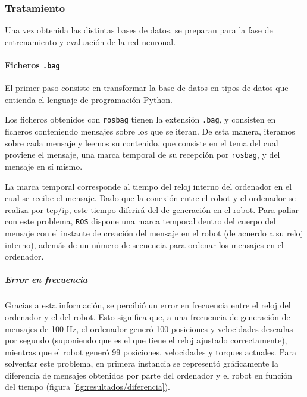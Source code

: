 \subsubsection{Tratamiento}
Una vez obtenida las distintas bases de datos, se preparan para la fase de entrenamiento y evaluación de la red neuronal.

\paragraph{Ficheros \texttt{.bag}}
El primer paso consiste en transformar la base de datos en tipos de datos que entienda el lenguaje de programación Python.

Los ficheros obtenidos con \texttt{rosbag} tienen la extensión \texttt{.bag}, y consisten en ficheros conteniendo mensajes sobre los que se iteran. De esta manera, iteramos sobre cada mensaje y leemos su contenido, que consiste en el tema del cual proviene el mensaje, una marca temporal de su recepción por \texttt{rosbag}, y del mensaje en sí mismo.

La marca temporal corresponde al tiempo del reloj interno del ordenador en el cual se recibe el mensaje. Dado que la conexión entre el robot y el ordenador se realiza por tcp/ip, este tiempo diferirá del de generación en el robot. Para paliar con este problema, \texttt{ROS} dispone una marca temporal dentro del cuerpo del mensaje con el instante de creación del mensaje en el robot (de acuerdo a su reloj interno), además de un número de secuencia para ordenar los mensajes en el ordenador.

\subparagraph{Error en frecuencia}
Gracias a esta información, se percibió un error en frecuencia entre el reloj del ordenador y el del robot. Esto significa que, a una frecuencia de generación de mensajes de 100 Hz, el ordenador generó 100 posiciones y velocidades deseadas por segundo (suponiendo que es el que tiene el reloj ajustado correctamente), mientras que el robot generó 99 posiciones, velocidades y torques actuales. Para solventar este problema, en primera instancia se representó gráficamente la diferencia de mensajes obtenidos por parte del ordenador y el robot en función del tiempo (figura \ref{fig:resultados/diferencia}).

